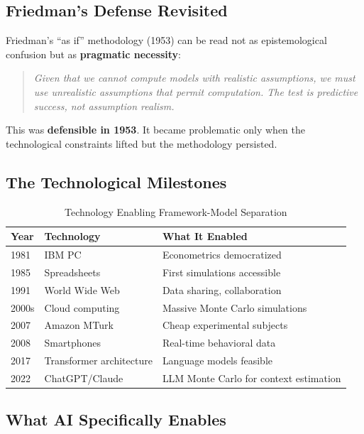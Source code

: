 \documentclass[12pt,a4paper]{article}
\begin{document}
\subsection{Friedman's Defense Revisited}

Friedman's ``as if'' methodology (1953) can be read not as epistemological confusion but as \textbf{pragmatic necessity}:

\begin{quote}
\textit{Given that we cannot compute models with realistic assumptions, we must use unrealistic assumptions that permit computation. The test is predictive success, not assumption realism.}
\end{quote}

This was \textbf{defensible in 1953}. It became problematic only when the technological constraints lifted but the methodology persisted.

\subsection{The Technological Milestones}

\begin{table}[H]
\centering
\caption{Technology Enabling Framework-Model Separation}
\label{tab:tech-milestones}
\renewcommand{\arraystretch}{1.3}
\small
\begin{tabular}{@{}llp{6cm}@{}}
\toprule
\textbf{Year} & \textbf{Technology} & \textbf{What It Enabled} \\
\midrule
1981 & IBM PC & Econometrics democratized \\
1985 & Spreadsheets & First simulations accessible \\
1991 & World Wide Web & Data sharing, collaboration \\
2000s & Cloud computing & Massive Monte Carlo simulations \\
2007 & Amazon MTurk & Cheap experimental subjects \\
2008 & Smartphones & Real-time behavioral data \\
2017 & Transformer architecture & Language models feasible \\
2022 & ChatGPT/Claude & LLM Monte Carlo for context estimation \\
\bottomrule
\end{tabular}
\end{table}

\subsection{What AI Specifically Enables}
\end{document}
